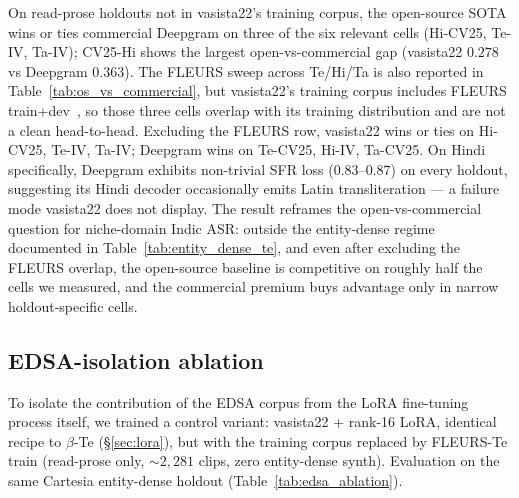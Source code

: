 \documentclass[conference,a4paper]{IEEEtran}
\begin{document}
On read-prose holdouts not in vasista22's training corpus, the open-source SOTA wins or ties commercial Deepgram on three of the six relevant cells (Hi-CV25, Te-IV, Ta-IV); CV25-Hi shows the largest open-vs-commercial gap (vasista22 $0.278$ vs Deepgram $0.363$). The FLEURS sweep across Te/Hi/Ta is also reported in Table~\ref{tab:os_vs_commercial}, but vasista22's training corpus includes FLEURS train+dev~\cite{vasista22}, so those three cells overlap with its training distribution and are not a clean head-to-head. Excluding the FLEURS row, vasista22 wins or ties on Hi-CV25, Te-IV, Ta-IV; Deepgram wins on Te-CV25, Hi-IV, Ta-CV25. On Hindi specifically, Deepgram exhibits non-trivial SFR loss ($0.83$--$0.87$) on every holdout, suggesting its Hindi decoder occasionally emits Latin transliteration --- a failure mode vasista22 does not display. The result reframes the open-vs-commercial question for niche-domain Indic ASR: outside the entity-dense regime documented in Table~\ref{tab:entity_dense_te}, and even after excluding the FLEURS overlap, the open-source baseline is competitive on roughly half the cells we measured, and the commercial premium buys advantage only in narrow holdout-specific cells.

\subsection{EDSA-isolation ablation}\label{sec:edsa_ablation}

To isolate the contribution of the EDSA corpus from the LoRA fine-tuning process itself, we trained a control variant: vasista22 + rank-16 LoRA, identical recipe to $\beta$-Te (\S\ref{sec:lora}), but with the training corpus replaced by FLEURS-Te train (read-prose only, $\sim 2{,}281$ clips, zero entity-dense synth). Evaluation on the same Cartesia entity-dense holdout (Table~\ref{tab:edsa_ablation}).

\begin{table}[t]
\centering
\caption{EDSA-isolation ablation on the entity-dense Telugu held-out set ($n=102$). Replacing the EDSA corpus with FLEURS-Te train (read-prose, $\sim 2{,}281$ clips) and holding the LoRA recipe fixed leaves entity-recognition capability at the vasista22-baseline floor; the EDSA corpus is the load-bearing input.}
\label{tab:edsa_ablation}
\end{table}
\end{document}
